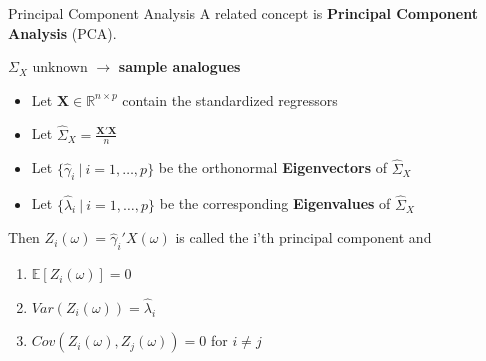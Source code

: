 \documentclass{beamer}
\begin{document}
	\begin{frame}{Principal Component Analysis}\label{PCA}
		A related concept is \textbf{Principal Component Analysis} (PCA).
		\vspace{0.2cm}
		
		$\Sigma_X$ unknown $\rightarrow$ \textbf{sample analogues}
		
		\begin{itemize}
			\item Let $\mathbf{X} \in \mathbb{R}^{n \times p}$ contain the standardized regressors
			\item Let $\hat{\Sigma}_X = \frac{\mathbf{X}'\mathbf{X}}{n}$
			\item Let $\{\hat{\gamma}_i \: \vert \: i = 1, \dots, p\}$ be the orthonormal \textbf{Eigenvectors} of $\hat{\Sigma}_X$
			\item Let $\{\hat{\lambda}_i \: \vert \: i = 1, \dots, p\}$ be the corresponding \textbf{Eigenvalues} of $\hat{\Sigma}_X$
		\end{itemize}
		\vspace{0.2cm} 
		
		Then $Z_i(\omega) = \hat{\gamma}_i' X(\omega)$ is called the i'th principal component and
		\begin{multicols}{2}
			\begin{enumerate}
				\item $\mathbb{E}[Z_i(\omega)] = 0$
				\item $Var(Z_i(\omega)) = \hat{\lambda}_i$
				\item $Cov(Z_i(\omega), Z_j(\omega)) = 0$ for $i \neq j$
			\end{enumerate}
		\end{multicols}
		\hyperlink{FPCA}{}
	\end{frame}
\end{document}
